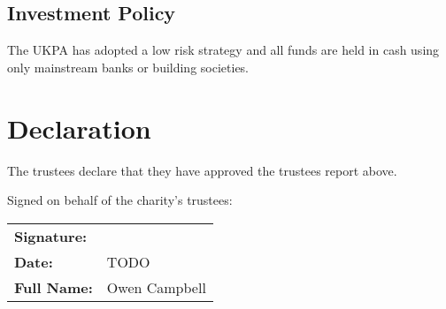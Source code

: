 \documentclass[11pt, final]{article}
\begin{document}
\subsection{Investment Policy}
The UKPA has adopted a low risk strategy and all funds are held in cash using only mainstream banks or building societies.

\section{Declaration}
The trustees declare that they have approved the trustees report above.


Signed on behalf of the charity's trustees:

\begin{tabular}{l l}
	\textbf{Signature:}\vspace{3cm}                       \\
	\textbf{Date:}      & TODO\vspace{1cm} \\
	\textbf{Full Name:} & Owen Campbell                   \\
\end{tabular}
\end{document}
